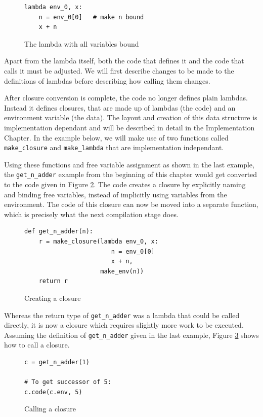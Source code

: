 \documentclass[11pt]{report}
\begin{document}
\begin{figure}[ht]
\begin{lstlisting}
lambda env_0, x: 
    n = env_0[0]   # make n bound
    x + n
\end{lstlisting}
\caption{The lambda with all variables bound}
\label{cc5}
\end{figure}

Apart from the lambda itself, both the code that defines it and the code that calls it must be adjusted. We will first describe changes to be made to the definitions of lambdas before describing how calling them changes.

After closure conversion is complete, the code no longer defines plain lambdas. Instead it defines closures, that are made up of lambdas (the code) and an environment variable (the data). The layout and creation of this data structure is implementation dependant and will be described in detail in the Implementation Chapter. In the example below, we will make use of two functions called \texttt{make_closure} and \texttt{make_lambda} that are implementation independant.

Using these functions and free variable assignment as shown in the last example, the \texttt{get_n_adder} example from the beginning of this chapter would get converted to the code given in Figure \ref{cc6}. The code creates a closure by explicitly naming and binding free variables, instead of implicitly using variables from the environment. The code of this closure can now be moved into a separate function, which is precisely what the next compilation stage does.

\begin{figure}[ht]
\begin{lstlisting}
def get_n_adder(n):
    r = make_closure(lambda env_0, x: 
                        n = env_0[0]
                        x + n, 
                     make_env(n))
    return r
\end{lstlisting}
\caption{Creating a closure}
\label{cc6}
\end{figure}

Whereas the return type of \texttt{get_n_adder} was a lambda that could be called directly, it is now a closure which requires slightly more work to be executed. Assuming the definition of \texttt{get_n_adder} given in the last example, Figure \ref{cc7} shows how to call a closure.

\begin{figure}[ht]
\begin{lstlisting}
c = get_n_adder(1)

# To get successor of 5:
c.code(c.env, 5)
\end{lstlisting}
\caption{Calling a closure}
\label{cc7}
\end{figure}
\end{document}
